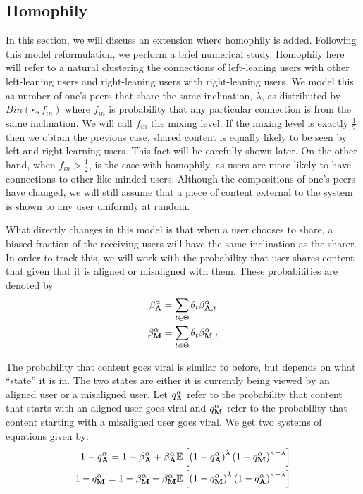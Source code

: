 \subsection{Homophily}\label{sec:homophil}
In this section, we will discuss an extension where homophily is added. Following this model reformulation, we perform a brief numerical study.  Homophily here will refer to a natural clustering the connections of left-leaning users with other left-leaning users and right-leaning users with right-leaning users. We model this as number of one's peers that share the same inclination, $\lambda$, as distributed by $Bin(\kappa, f_{in})$ where $f_{in}$ is probability that any particular connection is from the same inclination. We will call $f_{in}$ the mixing level. If the mixing level is exactly $\frac{1}{2}$ then we obtain the previous case, shared content is equally likely to be seen by left and right-learning users. This fact will be carefully shown later.  On the other hand, when $f_{in} > \frac{1}{2}$, is the case with homophily, as users are more likely to have connections to other like-minded users. Although the compositions of one's peers have changed, we will still assume that a piece of content external to the system is shown to any user uniformly at random. 

What directly changes in this model is that when a user chooses to share, a biased fraction of the receiving users will have the same inclination as the sharer. In order to track this, we will work with the probability that user shares content that given that it is aligned or misaligned with them.  These probabilities are denoted by
\begin{align}\label{eqn:new_share_prob}
\beta^\alpha_{\mathbf{A}} &= \sum_{t \in \Theta} \theta_t \beta_{\mathbf{A}, t}^\alpha  \\
\beta^\alpha_{\mathbf{M}} &= \sum_{t \in \Theta} \theta_t  \beta_{\mathbf{M}, t}^\alpha 
\end{align}

The probability that content goes viral is similar to before, but depends on what ``state'' it is in. The two states are either it is currently being viewed by an aligned user or a misaligned user. Let $q^\alpha_{\mathbf{A}}$ refer to the probability that content that starts with an aligned user goes viral and $q^\alpha_{\mathbf{M}}$ refer to the probability that content starting with a misaligned user goes viral. We get two systems of equations given by:
\begin{align}\label{eqn:new-fixed}
    1-q_{\mathbf{A}}^\alpha = 1 -\beta^\alpha_{\mathbf{A}} + \beta^\alpha_{\mathbf{A}} \mathbb{E}\left[ \left(1-q_{\mathbf{A}}^\alpha\right)^{\lambda} \left(1-q^\alpha_{\mathbf{M}}\right)^{\kappa - \lambda}\right] \\ 
     1-q_{\mathbf{M}}^\alpha = 1 -\beta^\alpha_{\mathbf{M}} + \beta^\alpha_{\mathbf{M}} \mathbb{E}\left[ \left(1-q_{\mathbf{M}}^\alpha\right)^{\lambda} \left(1-q^\alpha_{\mathbf{A}}\right)^{\kappa - \lambda} \right]
\end{align}

